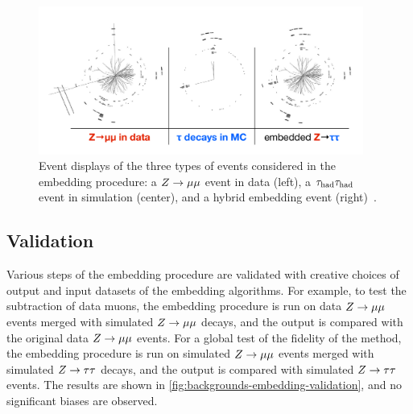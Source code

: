 \begin{figure}[tp]
  \centering
  \includegraphics[width=0.95\textwidth]{figures/backgrounds/embedding_eventdisplay}
  \caption{Event displays of the three types of events considered in the embedding procedure: a $Z \rightarrow \mu\mu$ event in data (left), a $\tau_\text{had}\tau_\text{had}$ event in simulation (center), and a hybrid embedding event (right)~\cite{ATL-COM-PHYS-2012-1201}.}
  \label{fig:backgrounds-embedding-eventdisplay}
\end{figure}

\subsection{Validation}

Various steps of the embedding procedure are validated with creative choices of output and input datasets of the embedding algorithms. For example, to test the subtraction of data muons, the embedding procedure is run on data $Z \rightarrow \mu\mu$ events merged with simulated $Z \rightarrow \mu\mu$ decays, and the output is compared with the original data $Z \rightarrow \mu\mu$ events. For a global test of the fidelity of the method, the embedding procedure is run on simulated $Z \rightarrow \mu\mu$ events merged with simulated $Z\rightarrow\tau\tau$ decays, and the output is compared with simulated $Z\rightarrow\tau\tau$ events. The results are shown in \cref{fig:backgrounds-embedding-validation}, and no significant biases are observed.

